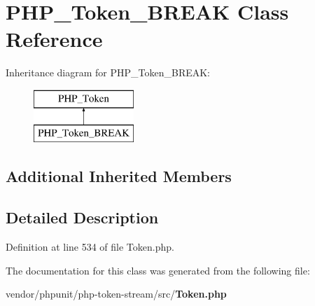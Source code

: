 \section{P\+H\+P\+\_\+\+Token\+\_\+\+B\+R\+E\+A\+K Class Reference}
\label{class_p_h_p___token___b_r_e_a_k}
Inheritance diagram for P\+H\+P\+\_\+\+Token\+\_\+\+B\+R\+E\+A\+K\+:\begin{figure}[H]
\begin{center}
\leavevmode
\includegraphics[height=2.000000cm]{class_p_h_p___token___b_r_e_a_k}
\end{center}
\end{figure}
\subsection*{Additional Inherited Members}


\subsection{Detailed Description}


Definition at line 534 of file Token.\+php.



The documentation for this class was generated from the following file\+:\begin{DoxyCompactItemize}
\item 
vendor/phpunit/php-\/token-\/stream/src/{\bf Token.\+php}\end{DoxyCompactItemize}
